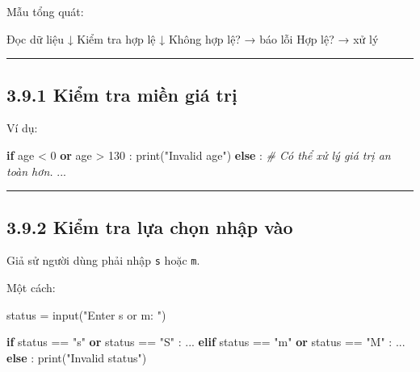 \documentclass[
  11pt,
  a4paper,
]{article}
\newenvironment{Shaded}{}{}
\newcommand{\BuiltInTok}[1]{\textcolor[rgb]{0.00,0.50,0.00}{#1}}
\newcommand{\CommentTok}[1]{\textcolor[rgb]{0.38,0.63,0.69}{\textit{#1}}}
\newcommand{\ControlFlowTok}[1]{\textcolor[rgb]{0.00,0.44,0.13}{\textbf{#1}}}
\newcommand{\DecValTok}[1]{\textcolor[rgb]{0.25,0.63,0.44}{#1}}
\newcommand{\KeywordTok}[1]{\textcolor[rgb]{0.00,0.44,0.13}{\textbf{#1}}}
\newcommand{\NormalTok}[1]{#1}
\newcommand{\OperatorTok}[1]{\textcolor[rgb]{0.40,0.40,0.40}{#1}}
\newcommand{\StringTok}[1]{\textcolor[rgb]{0.25,0.44,0.63}{#1}}
\begin{document}
Mẫu tổng quát:

\begin{Shaded}
\begin{Highlighting}[]
\NormalTok{Đọc dữ liệu}
\NormalTok{   ↓}
\NormalTok{Kiểm tra hợp lệ}
\NormalTok{   ↓}
\NormalTok{Không hợp lệ? → báo lỗi}
\NormalTok{Hợp lệ?       → xử lý}
\end{Highlighting}
\end{Shaded}

\begin{center}\rule{0.5\linewidth}{0.5pt}\end{center}

\subsection{3.9.1 Kiểm tra miền giá
trị}\label{kiux1ec3m-tra-miux1ec1n-giuxe1-trux1ecb}

Ví dụ:

\begin{Shaded}
\begin{Highlighting}[]
\ControlFlowTok{if}\NormalTok{ age }\OperatorTok{\textless{}} \DecValTok{0} \KeywordTok{or}\NormalTok{ age }\OperatorTok{\textgreater{}} \DecValTok{130}\NormalTok{ :}
    \BuiltInTok{print}\NormalTok{(}\StringTok{"Invalid age"}\NormalTok{)}
\ControlFlowTok{else}\NormalTok{ :}
    \CommentTok{\# Có thể xử lý giá trị an toàn hơn.}
\NormalTok{    ...}
\end{Highlighting}
\end{Shaded}

\begin{center}\rule{0.5\linewidth}{0.5pt}\end{center}

\subsection{3.9.2 Kiểm tra lựa chọn nhập
vào}\label{kiux1ec3m-tra-lux1ef1a-chux1ecdn-nhux1eadp-vuxe0o}

Giả sử người dùng phải nhập \texttt{s} hoặc \texttt{m}.

Một cách:

\begin{Shaded}
\begin{Highlighting}[]
\NormalTok{status }\OperatorTok{=} \BuiltInTok{input}\NormalTok{(}\StringTok{"Enter s or m: "}\NormalTok{)}

\ControlFlowTok{if}\NormalTok{ status }\OperatorTok{==} \StringTok{"s"} \KeywordTok{or}\NormalTok{ status }\OperatorTok{==} \StringTok{"S"}\NormalTok{ :}
\NormalTok{    ...}
\ControlFlowTok{elif}\NormalTok{ status }\OperatorTok{==} \StringTok{"m"} \KeywordTok{or}\NormalTok{ status }\OperatorTok{==} \StringTok{"M"}\NormalTok{ :}
\NormalTok{    ...}
\ControlFlowTok{else}\NormalTok{ :}
    \BuiltInTok{print}\NormalTok{(}\StringTok{"Invalid status"}\NormalTok{)}
\end{Highlighting}
\end{Shaded}
\end{document}
